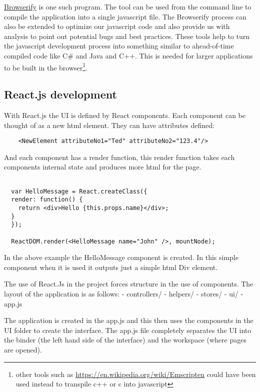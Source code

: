 \href{http://browserify.org/}{Browserify} is one such program. The tool can be
used from the command line to compile the application into a single javascript
file. The Browserify process can also be extended to optimize our javascript
code and also provide us with analysis to point out potential bugs and best
practices. These tools help to turn the javascript development process into
something similar to ahead-of-time compiled code like C\# and Java and C++. This
is needed for larger applications to be built in the browser\footnote{ other
tools such as \url{https://en.wikipedia.org/wiki/Emscripten} could have been
used instead to transpile c++ or c into javascript }.

\subsection{React.js development}\label{react.js-development}

With React.js the UI is defined by React components. Each component can
be thought of as a new html element. They can have attributes defined:

\begin{listing}[ht]
  \begin{verbatim}
    <NewElement attributeNo1="Ted" attributeNo2="123.4"/>
  \end{verbatim}
\end{listing}

And each component has a render function, this render function takes
each components internal state and produces more html for the page.


\begin{verbatim}

  var HelloMessage = React.createClass({
  render: function() {
    return <div>Hello {this.props.name}</div>;
  }
  });

  ReactDOM.render(<HelloMessage name="John" />, mountNode);

\end{verbatim}

In the above example the HelloMessage component is created. In this
simple component when it is used it outputs just a simple html Div
element.

The use of React.Js in the project forces structure in the use of
components. The layout of the application is as follows: - controllers/
- helpers/ - stores/ - ui/ - app.js

The application is created in the app.js and this then uses the
components in the UI folder to create the interface. The app.js file
completely separates the UI into the binder (the left hand side of the
interface) and the workspace (where pages are opened).

